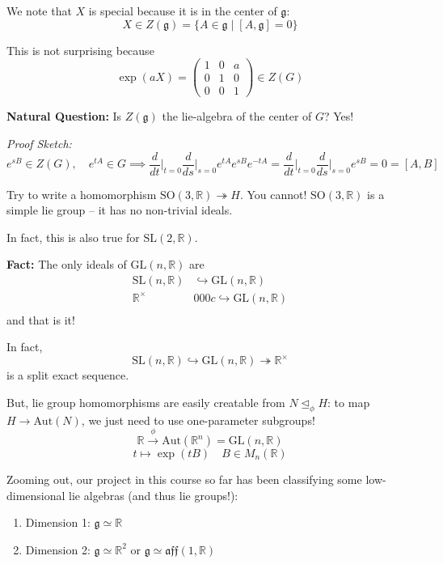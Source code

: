 \documentclass[12pt]{article}
\newcommand{\R}{\mathbb{R}}
\newcommand{\SL}{\text{SL}}
\newcommand{\SO}{\text{SO}}
\newcommand{\GL}{\text{GL}}
\newcommand{\g}{\mathfrak{g}}
\newcommand{\Aut}{\text{Aut}}
\begin{document}
    We note that $X$ is special because it is in the center of $\g$: 
    \[X \in Z(\g) = \{A \in \g \; | \; [A, \g] = 0\}\]

    This is not surprising because 
    \[\exp(aX) = \begin{pmatrix}
        1 & 0 & a\\ 
        0 & 1 & 0\\ 
        0 & 0 & 1
    \end{pmatrix} \in Z(G)\] 

    \textbf{Natural Question:} Is $Z(\g)$ the lie-algebra of the center of $G$? Yes! 

    \emph{Proof Sketch:} 
    \[e^{sB} \in Z(G), \quad e^{tA} \in G \implies \frac{d}{dt}\bigg\vert_{t=0} \frac{d}{ds}\bigg\vert_{s=0} e^{tA} e^{sB} e^{-tA} = \frac{d}{dt}\bigg\vert_{t=0} \frac{d}{ds}\bigg\vert_{s=0} e^{sB} = 0 = [A, B]\] 

   Try to write a homomorphism $\SO(3, \R) \twoheadrightarrow H$. You cannot! $\SO(3, \R)$ is a simple lie group -- it has no non-trivial ideals. 

   In fact, this is also true for $\SL(2, \R)$. 

   \textbf{Fact:} The only ideals of $\GL(n, \R)$ are 
   \begin{align*}
        \SL(n, \R) &\hookrightarrow \GL(n, \R)\\
        \R^{\times} &0 0 0c\hookrightarrow \GL(n, \R)\\
   \end{align*}
   and that is it! 

   In fact, 
   \[\SL(n, \R) \hookrightarrow \GL(n, \R) \twoheadrightarrow \R^{\times}\]
   is a split exact sequence. 

   But, lie group homomorphisms are easily creatable from $N \trianglelefteq_{\phi} H$: to map $H \to \Aut(N)$, we just need to use one-parameter subgroups!
   \[\R \overset{\phi}{\to} \Aut(\R^n) = \GL(n, \R)\]
   \[t \mapsto \exp(tB) \quad B \in M_n(\R)\]

   Zooming out, our project in this course so far has been classifying some low-dimensional lie algebras (and thus lie groups!): 

   \begin{enumerate}
        \item Dimension 1: $\g \simeq \R$ 
        \item Dimension 2: $\g \simeq \R^2$ or $\g \simeq \mathfrak{aff}(1, \R)$
   \end{enumerate}
\end{document}
